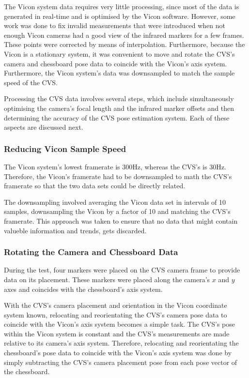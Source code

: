 The Vicon system data requires very little processing, since most of the data is generated in real-time and is optimised by the Vicon software. However, some work was done to fix invalid measurements that were introduced when not enough Vicon cameras had a good view of the infrared markers for a few frames. These points were corrected by means of interpolation. Furthermore, because the Vicon is a stationary system, it was convenient to move and rotate the CVS's camera and chessboard pose data to coincide with the Vicon's axis system. Furthermore, the Vicon system's data was downsampled to match the sample speed of the CVS. 

Processing the CVS data involves several steps, which include simultaneously optimising the camera's focal length and the infrared marker offsets and then determining the accuracy of the CVS pose estimation system. Each of these aspects are discussed next.

\subsubsection{Reducing Vicon Sample Speed}

The Vicon system's lowest framerate is 300Hz, whereas the CVS's is 30Hz. Therefore, the Vicon's framerate had to be downsampled to math the CVS's framerate so that the two data sets could be directly related. 

The downsampling involved averaging the Vicon data set in intervals of 10 samples, downsampling the Vicon by a factor of 10 and matching the CVS's framerate. This approach was taken to ensure that no data that might contain valueble information and trends, gets discarded. 

\subsubsection{Rotating the Camera and Chessboard Data}
\label{sec:rotate-axes}

During the test, four markers were placed on the CVS camera frame to provide data on its placement. These markers were placed along the camera's $x$ and $y$ axes and coincides with the chessboard's axis system. 

With the CVS's camera placement and orientation in the Vicon coordinate system known, relocating and reorientating the CVS's camera pose data to coincide with the Vicon's axis system becomes a simple task. The CVS's pose within the Vicon system is constant and the CVS's measurements are made relative to its camera's axis system. Therefore, relocating and reorientating the chessboard's pose data to coincide with the Vicon's axis system was done by simply subtracting the CVS's camera placement pose from each pose vector of the chessboard.

